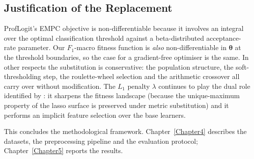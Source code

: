 \subsection{Justification of the Replacement}

ProfLogit's EMPC objective is non-differentiable because it involves
an integral over the optimal classification threshold against a
beta-distributed acceptance-rate parameter. Our $F_1$-macro
fitness function is \emph{also} non-differentiable in
$\boldsymbol{\theta}$ at the threshold boundaries, so the case for a
gradient-free optimiser is the same. In other respects the
substitution is conservative: the population structure, the
soft-thresholding step, the roulette-wheel selection and the
arithmetic crossover all carry over without modification. The
$L_1$ penalty $\lambda$ continues to play the dual role identified
by \citet{stripling2018proflogit}: it sharpens the fitness
landscape (because the unique-maximum property of the lasso surface
is preserved under metric substitution) and it performs an implicit
feature selection over the base learners.

This concludes the methodological framework.
Chapter~\ref{Chapter4} describes the datasets, the preprocessing
pipeline and the evaluation protocol; Chapter~\ref{Chapter5}
reports the results.
